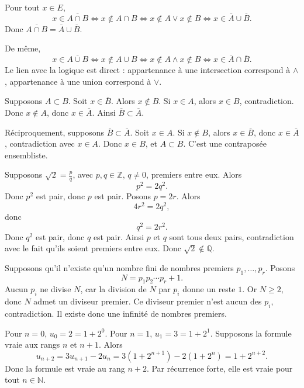 \documentclass[11pt,a4paper]{article}
\newcommand{\N}{\mathbb{N}}
\newcommand{\Z}{\mathbb{Z}}
\newcommand{\Q}{\mathbb{Q}}
\newcommand{\et}{\wedge}
\newcommand{\ou}{\vee}
\newcommand{\ssi}{\Longleftrightarrow}
\begin{document}
\begin{correctionbox}[DEM 24]
Pour tout \(x\in E\),
\[
x\in\overline{A\cap B}
\ssi x\notin A\cap B
\ssi x\notin A\ou x\notin B
\ssi x\in\overline A\cup\overline B.
\]
Donc \(\overline{A\cap B}=\overline A\cup\overline B\).

De même,
\[
x\in\overline{A\cup B}
\ssi x\notin A\cup B
\ssi x\notin A\et x\notin B
\ssi x\in\overline A\cap\overline B.
\]
Le lien avec la logique est direct : appartenance à une intersection correspond à \(\et\), appartenance à une union correspond à \(\ou\).
\end{correctionbox}

\begin{correctionbox}[DEM 25]
Supposons \(A\subset B\). Soit \(x\in\overline B\). Alors \(x\notin B\). Si \(x\in A\), alors \(x\in B\), contradiction. Donc \(x\notin A\), donc \(x\in\overline A\). Ainsi \(\overline B\subset\overline A\).

Réciproquement, supposons \(\overline B\subset\overline A\). Soit \(x\in A\). Si \(x\notin B\), alors \(x\in\overline B\), donc \(x\in\overline A\), contradiction avec \(x\in A\). Donc \(x\in B\), et \(A\subset B\). C'est une contraposée ensembliste.
\end{correctionbox}

\begin{correctionbox}[DEM 26]
Supposons \(\sqrt2=\frac pq\), avec \(p,q\in\Z\), \(q\neq0\), premiers entre eux. Alors
\[
p^2=2q^2.
\]
Donc \(p^2\) est pair, donc \(p\) est pair. Posons \(p=2r\). Alors
\[
4r^2=2q^2,
\]
donc
\[
q^2=2r^2.
\]
Donc \(q^2\) est pair, donc \(q\) est pair. Ainsi \(p\) et \(q\) sont tous deux pairs, contradiction avec le fait qu'ils soient premiers entre eux. Donc \(\sqrt2\notin\Q\).
\end{correctionbox}

\begin{correctionbox}[DEM 27]
Supposons qu'il n'existe qu'un nombre fini de nombres premiers \(p_1,\dots,p_r\). Posons
\[
N=p_1p_2\cdots p_r+1.
\]
Aucun \(p_i\) ne divise \(N\), car la division de \(N\) par \(p_i\) donne un reste \(1\). Or \(N\geq2\), donc \(N\) admet un diviseur premier. Ce diviseur premier n'est aucun des \(p_i\), contradiction. Il existe donc une infinité de nombres premiers.
\end{correctionbox}

\begin{correctionbox}[DEM 28]
Pour \(n=0\), \(u_0=2=1+2^0\). Pour \(n=1\), \(u_1=3=1+2^1\). Supposons la formule vraie aux rangs \(n\) et \(n+1\). Alors
\[
u_{n+2}=3u_{n+1}-2u_n
=3(1+2^{n+1})-2(1+2^n)
=1+2^{n+2}.
\]
Donc la formule est vraie au rang \(n+2\). Par récurrence forte, elle est vraie pour tout \(n\in\N\).
\end{correctionbox}
\end{document}
